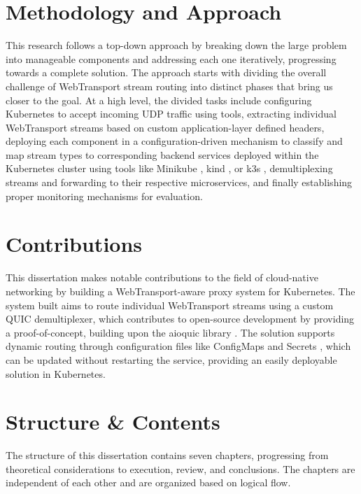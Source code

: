 \section{Methodology and Approach}

This research follows a top-down approach by breaking down the large problem into manageable components and addressing each one iteratively, progressing towards a complete solution. The approach starts with dividing the overall challenge of WebTransport stream routing into distinct phases that bring us closer to the goal. At a high level, the divided tasks include configuring Kubernetes \cite{kubernetes-docs} to accept incoming UDP traffic using tools, extracting individual WebTransport streams based on custom application-layer defined headers, deploying each component in a configuration-driven mechanism to classify and map stream types to corresponding backend services deployed within the Kubernetes cluster using tools like Minikube \cite{minikube-docs}, kind \cite{kind-docs}, or k3s \cite{k3s-docs}, demultiplexing streams and forwarding to their respective microservices, and finally establishing proper monitoring mechanisms for evaluation.

\section{Contributions}

This dissertation makes notable contributions to the field of cloud-native networking by building a WebTransport-aware proxy system for Kubernetes. The system built aims to route individual WebTransport streams using a custom QUIC demultiplexer, which contributes to open-source development by providing a proof-of-concept, building upon the aioquic library \cite{aioquic-repo}. The solution supports dynamic routing through configuration files like ConfigMaps and Secrets \cite{kubernetes-docs}, which can be updated without restarting the service, providing an easily deployable solution in Kubernetes.


\section{Structure \& Contents}

The structure of this dissertation contains seven chapters, progressing from theoretical considerations to execution, review, and conclusions. The chapters are independent of each other and are organized based on logical flow.

